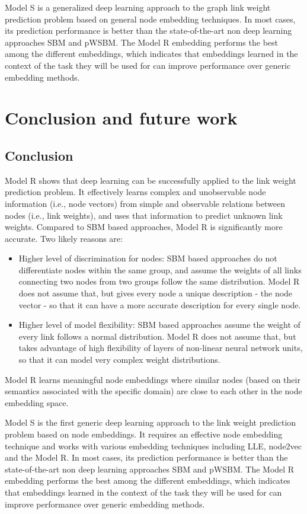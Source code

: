 \documentclass[12pt]{WSUThesis}
\theoremstyle{definition}
\begin{document}
Model S is a generalized deep learning approach to the graph link weight prediction problem based on general node embedding techniques.
In most cases, its prediction performance is better than the state-of-the-art non deep learning approaches SBM and pWSBM.
The Model R embedding performs the best among the different embeddings, which indicates that embeddings learned in the context of the task they will be used for can improve performance over generic embedding methods.

\chapter{Conclusion and future work}

\section{Conclusion}
Model R shows that deep learning can be successfully applied to the link weight prediction problem.
It effectively learns complex and unobservable node information (i.e., node vectors) from simple and observable relations between nodes (i.e., link weights),
and uses that information to predict unknown link weights.
Compared to SBM based approaches, Model R is significantly more accurate.
Two likely reasons are:
\begin{itemize}
	\item Higher level of discrimination for nodes:
	SBM based approaches do not differentiate nodes within the same group,
	and assume the weights of all links connecting two nodes from two groups
	follow the same distribution.
	Model R does not assume that,
	but gives every node a unique description - the node vector - so that
	it can have a more accurate description for every single node.
	\item Higher level of model flexibility:
	SBM based approaches assume the weight of every link follows
	a normal distribution.
	Model R does not assume that, but takes advantage of high flexibility of
	layers of non-linear neural network units,
	so that it can model very complex weight distributions.
\end{itemize}
Model R learns meaningful node embeddings where similar nodes (based on their semantics associated with the specific domain) are close to each other in the node embedding space.

Model S is the first generic deep learning approach to the link weight prediction problem based on node embeddings.
It requires an effective node embedding technique and works with various embedding techniques including
LLE, node2vec and the Model R.
In most cases, its prediction performance is better than the state-of-the-art non deep learning approaches SBM and pWSBM.
The Model R embedding performs the best among the different embeddings, which indicates that embeddings learned in the context of the task they will be used for can improve performance over generic embedding methods.
\end{document}
